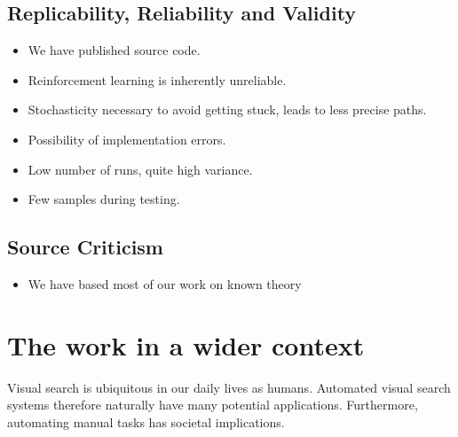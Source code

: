 \subsection{Replicability, Reliability and Validity}

\begin{itemize}
    \item We have published source code.
    \item Reinforcement learning is inherently unreliable.
    \item Stochasticity necessary to avoid getting stuck, leads to less precise paths.
    \item Possibility of implementation errors.
    \item Low number of runs, quite high variance.
    \item Few samples during testing.
\end{itemize}

\subsection{Source Criticism}

\begin{itemize}
    \item We have based most of our work on known theory
\end{itemize}

\section{The work in a wider context}

% 

\cite{vinuesa_sustainable_2020}

\cite{russell_priorities_2015}

\cite{russell_ethics_2015}

\cite{russell_beneficial_2022}

Visual search is ubiquitous in our daily lives as humans.
Automated visual search systems therefore naturally have many potential applications.
Furthermore, automating manual tasks has societal implications.

